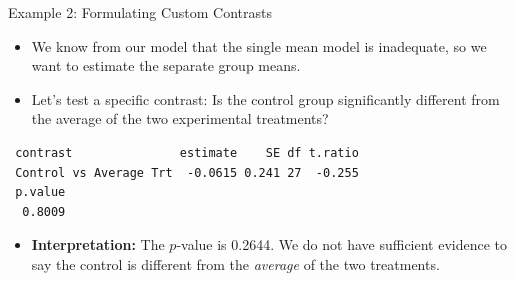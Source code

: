\begin{frame}{Example 2: Formulating Custom Contrasts}
  \begin{itemize}
    \item We know from our model that the single mean model is inadequate, so we want to estimate the separate group means.
    \item Let's test a specific contrast: Is the control group significantly different from the average of the two experimental treatments?
  \end{itemize}
  
\begin{knitrout}\scriptsize
{}\color{fgcolor}\begin{kframe}
\begin{alltt}

 \hlkwb{<-}  \hlopt{~} 

 \hlkwb{<-} \hldef{(} \hldef{=} \hldef{(}\hldef{,} \hlopt{-}\hldef{,} \hlopt{-}\hldef{))}

  
\end{alltt}
\begin{verbatim}
 contrast               estimate    SE df t.ratio
 Control vs Average Trt  -0.0615 0.241 27  -0.255
 p.value
  0.8009
\end{verbatim}
\end{kframe}
\end{knitrout}

  \begin{itemize}
    \item \textbf{Interpretation:} The $p$-value is 0.2644. We do not have sufficient evidence to say the control is different from the \emph{average} of the two treatments.
  \end{itemize}
\end{frame}

